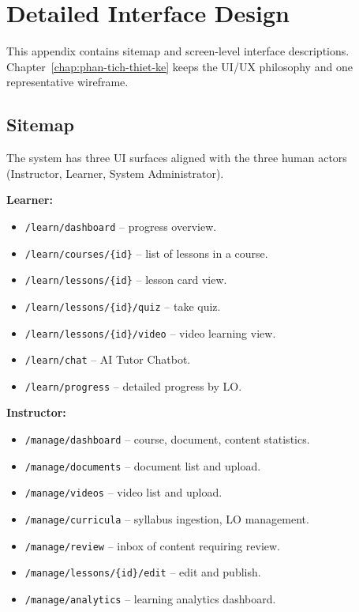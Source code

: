 \chapter{Detailed Interface Design}
\label{appendix:ui-details}

This appendix contains sitemap and screen-level interface descriptions.
Chapter~\ref{chap:phan-tich-thiet-ke} keeps the UI/UX philosophy and one
representative wireframe.

\section{Sitemap}
\label{appendix:ui-sitemap}

The system has three UI surfaces aligned with the three human actors
(Instructor, Learner, System Administrator).

\textbf{Learner:}
\begin{itemize}
    \item \texttt{/learn/dashboard} -- progress overview.
    \item \texttt{/learn/courses/\{id\}} -- list of lessons in a course.
    \item \texttt{/learn/lessons/\{id\}} -- lesson card view.
    \item \texttt{/learn/lessons/\{id\}/quiz} -- take quiz.
    \item \texttt{/learn/lessons/\{id\}/video} -- video learning view.
    \item \texttt{/learn/chat} -- AI Tutor Chatbot.
    \item \texttt{/learn/progress} -- detailed progress by LO.
\end{itemize}

\textbf{Instructor:}
\begin{itemize}
    \item \texttt{/manage/dashboard} -- course, document, content statistics.
    \item \texttt{/manage/documents} -- document list and upload.
    \item \texttt{/manage/videos} -- video list and upload.
    \item \texttt{/manage/curricula} -- syllabus ingestion, LO management.
    \item \texttt{/manage/review} -- inbox of content requiring review.
    \item \texttt{/manage/lessons/\{id\}/edit} -- edit and publish.
    \item \texttt{/manage/analytics} -- learning analytics dashboard.
\end{itemize}

